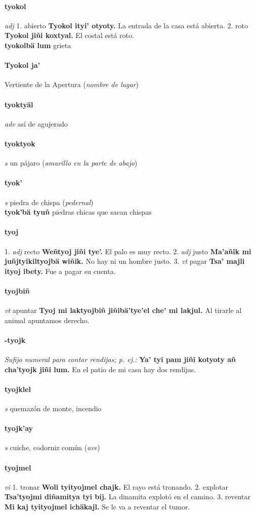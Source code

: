 \documentclass{scrbook}
\newcommand{\entry}[1]{\paragraph{#1}}
\newcommand{\onedefinition}[1]{#1.}
\newcommand{\nontranslationdef}[1]{\textit{#1}}
\newcommand{\partofspeech}[1]{\textit{#1}}
\newcommand{\spanishtranslation}[1]{#1}
\newcommand{\clarification}[1]{(\textit{#1})}
\newcommand{\cholexample}[1]{\textbf{#1}}
\newcommand{\exampletranslation}[1]{#1}
\newcommand{\secondaryentry}[1]{\\\textbf{#1}}
\newcommand{\secondtranslation}[1]{#1}
\begin{document}
\begin{multicols}{2}
\entry{tyokol}
\partofspeech{adj}
\onedefinition{1}
\spanishtranslation{abierto}
\cholexample{Tyokol ityi' otyoty.}
\exampletranslation{La entrada de la casa está abierta.}
\onedefinition{2}
\spanishtranslation{roto}
\cholexample{Tyokol jiñi koxtyal.}
\exampletranslation{El costal está roto.}
\secondaryentry{tyokolbä lum}
\secondtranslation{grieta}

\entry{Tyokol ja'}
\spanishtranslation{Vertiente de la Apertura}
\clarification{nombre de lugar}

\entry{tyoktyäl}
\partofspeech{adv}
\spanishtranslation{así de agujerado}

\entry{tyoktyok}
\partofspeech{s}
\spanishtranslation{un pájaro}
\clarification{amarillo en la parte de abajo}

\entry{tyok'}
\partofspeech{s}
\spanishtranslation{piedra de chispa}
\clarification{pedernal}
\secondaryentry{tyok'bä tyuñ}
\secondtranslation{piedras chicas que sacan chispas}

\entry{tyoj}
\onedefinition{1}
\partofspeech{adj}
\spanishtranslation{recto}
\cholexample{Weñtyoj jiñi tye'.}
\exampletranslation{El palo es muy recto.}
\onedefinition{2}
\partofspeech{adj}
\spanishtranslation{justo}
\cholexample{Ma'añik mi juñjtyikiltyojbä wiñik.}
\exampletranslation{No hay ni un hombre justo.}
\onedefinition{3}
\partofspeech{vt}
\spanishtranslation{pagar}
\cholexample{Tsa' majli ityoj ibety.}
\exampletranslation{Fue a pagar su cuenta.}

\entry{tyojbiñ}
\partofspeech{vt}
\spanishtranslation{apuntar}
\cholexample{Tyoj mi laktyojbiñ jiñibä'tye'el che' mi lakjul.}
\exampletranslation{Al tirarle al animal apuntamos derecho.}

\entry{-tyojk}
\nontranslationdef{Sufijo numeral para contar rendijas; p. ej.:}
\cholexample{Ya' tyi pam jiñi kotyoty añ cha'tyojk jiñi lum.}
\exampletranslation{En el patio de mi casa hay dos rendijas.}

\entry{tyojklel}
\partofspeech{s}
\spanishtranslation{quemazón de monte, incendio}

\entry{tyojk'ay}
\partofspeech{s}
\spanishtranslation{cuiche, codorniz común}
\clarification{ave}

\entry{tyojmel}
\partofspeech{vi}
\onedefinition{1}
\spanishtranslation{tronar}
\cholexample{Woli tyityojmel chajk.}
\exampletranslation{El rayo está tronando.}
\onedefinition{2}
\spanishtranslation{explotar}
\cholexample{Tsa'tyojmi diñamitya tyi bij.}
\exampletranslation{La dinamita explotó en el camino.}
\onedefinition{3}
\spanishtranslation{reventar}
\cholexample{Mi kaj tyityojmel ichäkajl.}
\exampletranslation{Se le va a reventar el tumor.}


\end{multicols}
\end{document}
